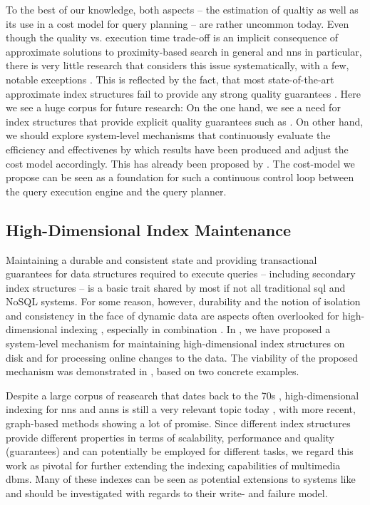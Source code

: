 To the best of our knowledge, both aspects -- the estimation of qualtiy as well as its use in a cost model for query planning -- are rather uncommon today. Even though the quality vs. execution time trade-off is an implicit consequence of approximate solutions to proximity-based search in general and \acrshort{nns} in particular, there is very little research that considers this issue systematically, with a few, notable exceptions \cite{Weber:2000Trading,Blok2001:Predicting,Siguroardottir:2005Quality}. This is reflected by the fact, that most state-of-the-art approximate index structures fail to provide any strong quality guarantees \cite{Echihabi:2021High}. Here we see a huge corpus for future research: On the one hand, we see a need for index structures that provide explicit quality guarantees such as \cite{Lu:2020VHP}. On other hand, we should explore system-level mechanisms that continuously evaluate the efficiency and effectivenes by which results have been produced and adjust the cost model accordingly. This has already been proposed by \cite{Giangreco:2018Database}. The cost-model we propose can be seen as a foundation for such a continuous control loop between the query execution engine and the query planner.

\subsection{High-Dimensional Index Maintenance}

Maintaining a durable and consistent state and providing transactional guarantees for data structures required to execute queries -- including secondary index structures -- is a basic trait shared by most if not all traditional \acrshort{sql} and NoSQL systems. For some reason, however, durability and the notion of isolation and consistency in the face of dynamic data are aspects often overlooked for high-dimensional indexing \cite{Amsaleg:2014Database,Hojsgaard:2019Index}, especially in combination \cite{Amsaleg:2014Database}. In , we have proposed a system-level mechanism for maintaining high-dimensional index structures on disk and for processing online changes to the data. The viability of the proposed mechanism was demonstrated in , based on two concrete examples.

Despite a large corpus of reasearch that dates back to the 70s \cite{Bentley:1975Multidimensional,Guttmann:1984RTrees,Beckmann:1990RTree,Indyk1998:Approximate,Weber:1998Va,Jegou:2010Product}, high-dimensional indexing for \acrshort{nns} and \acrshort{anns} is still a very relevant topic today \cite{Shimomura:2021Survey,Kraska:2018Case}, with more recent, graph-based methods showing a lot of promise. Since different index structures provide different properties in terms of scalability, performance and quality (guarantees) and can potentially be employed for different tasks, we regard this work as pivotal for further extending the indexing capabilities of multimedia \acrshort{dbms}. Many of these indexes can be seen as potential extensions to systems like \cottontail{} and should be investigated with regards to their write- and failure model.

